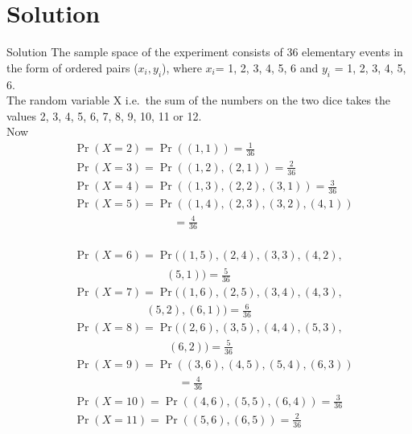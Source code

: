 \documentclass{beamer}
\theoremstyle{remark}
\numberwithin{equation}{section}
\numberwithin{figure}{section}
\numberwithin{table}{section}
\begin{document}
\section{Solution} 
\begin{frame}{Solution}
The sample space of the experiment consists of 36 elementary events in the
form of ordered pairs ($x_i, y_i$), where $x_i $= 1, 2, 3, 4, 5, 6 and $y_i$ = 1, 2, 3, 4, 5, 6.\\
The random variable X i.e.\ the sum of the numbers on the two dice takes the
values 2, 3, 4, 5, 6, 7, 8, 9, 10, 11 or 12.\\
Now
\begin{align}
&\Pr(X = 2) = \Pr({(1,1)}) = \frac{1}{36}\\
&\Pr(X = 3) = \Pr({(1,2), (2,1)}) = \frac{2}{36}\\ 
&\Pr(X = 4) = \Pr({(1,3), (2,2), (3,1)}) = \frac{3}{36}\\
&\Pr(X = 5) = \Pr({(1,4), (2,3), (3,2), (4,1)}) \nonumber\\ 
&~~~~~~~~~~~~~~~~~~~~~~~~~~~~~~~~~~~~~~~~= \frac{4}{36}\\
\end{align}
\end{frame}
\begin{frame}
\begin{align}
&\Pr(X = 6) = \Pr((1,5), (2,4), (3,3), (4,2), \nonumber\\
& ~~~~~~~~~~~~~~~~~~~~~~~~~~~~~~~~~~~~~(5,1)) = \frac{5}{36}\\
&\Pr(X = 7) = \Pr((1,6), (2,5), (3,4), (4,3),\nonumber\\
&~~~~~~~~~~~~~~~~~~~~~~~~~~~~~(5,2), (6,1)) = \frac{6}{36}\\  
&\Pr(X = 8) = \Pr((2,6), (3,5), (4,4), (5,3),\nonumber\\ 
&~~~~~~~~~~~~~~~~~~~~~~~~~~~~~~~~~~~~~~(6,2)) = \frac{5}{36}\\   
&\Pr(X = 9) = \Pr({(3,6), (4,5), (5,4), (6,3)}) \nonumber\\
&~~~~~~~~~~~~~~~~~~~~~~~~~~~~~~~~~~~~~~~~~~= \frac{4}{36}\\ 
&\Pr(X = 10) = \Pr({(4,6), (5,5), (6,4)}) = \frac{3}{36}\\
&\Pr(X = 11) = \Pr({(5,6), (6,5)}) = \frac{2}{36}\\  
\end{align}
\end{frame}
\end{document}
